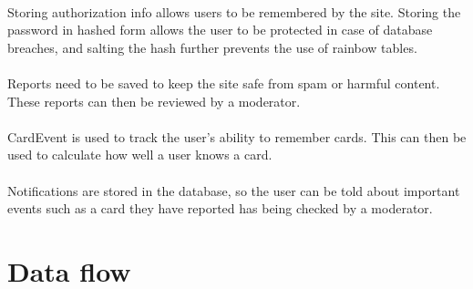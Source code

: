 \documentclass{report}
\begin{document}
\paragraph{}
Storing authorization info allows users to be remembered by the site. Storing the password in hashed form allows the user to be protected in case of database breaches, and salting the hash further prevents the use of rainbow tables.

\paragraph{}
Reports need to be saved to keep the site safe from spam or harmful content. These reports can then be reviewed by a moderator.

\paragraph{}
CardEvent is used to track the user's ability to remember cards. This can then be used to calculate how well a user knows a card.

\paragraph{}
Notifications are stored in the database, so the user can be told about important events such as a card they have reported has being checked by a moderator.

\section{Data flow}
\paragraph{}

\printbibliography
\end{document}
